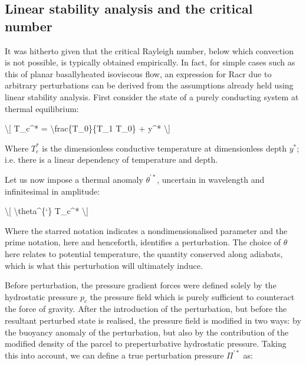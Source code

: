 \documentclass[letterpaper,10pt,english]{jupyterBook}
\begin{document}
\subsection{Linear stability analysis and the critical  number}
\label{\detokenize{content/chapter_02_methods/section1:linear-stability-analysis-and-the-critical-rayleigh-number}}
\sphinxAtStartPar
It was hitherto given that the critical Rayleigh number, below which convection is not possible, is typically obtained empirically. In fact, for simple cases such as this of planar basally\sphinxhyphen{}heated isoviscous flow, an expression for Racr due to arbitrary perturbations can be derived from the assumptions already held using linear stability analysis. First consider the state of a purely conducting system at thermal equilibrium:

\sphinxAtStartPar
\textbackslash{}{[} T\_c\textasciicircum{}* = \textbackslash{}frac\{T\_0\}\{T\_1 \sphinxhyphen{} T\_0\} + y\textasciicircum{}* \textbackslash{}{]}

\sphinxAtStartPar
Where \(T_c^*\) is the dimensionless conductive temperature at dimensionless depth \(y^*\); i.e. there is a linear dependency of temperature and depth.

\sphinxAtStartPar
Let us now impose a thermal anomaly \(\theta^{'*}\), uncertain in wavelength and infinitesimal in amplitude:

\sphinxAtStartPar
\textbackslash{}{[} \textbackslash{}theta\textasciicircum{}\{‘\} \sphinxhyphen{} T\_c\textasciicircum{}* \textbackslash{}{]}

\sphinxAtStartPar
Where the starred notation indicates a non\sphinxhyphen{}dimensionalised parameter and the prime notation, here and henceforth, identifies a perturbation. The choice of \(\theta\) here relates to potential temperature, the quantity conserved along adiabats, which is what this perturbation will ultimately induce.

\sphinxAtStartPar
Before perturbation, the pressure gradient forces were defined solely by the hydrostatic pressure \(p_c\) \sphinxhyphen{} the pressure field which is purely sufficient to counteract the force of gravity. After the introduction of the perturbation, but before the resultant perturbed state is realised, the pressure field is modified in two ways: by the buoyancy anomaly of the perturbation, but also by the contribution of the modified density of the parcel to pre\sphinxhyphen{}perturbative hydrostatic pressure. Taking this into account, we can define a true perturbation pressure \(\Pi^{'*}\) as:
\end{document}
